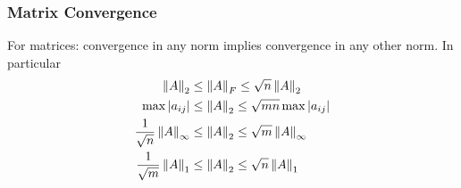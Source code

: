\documentclass{beamer}
\begin{document}
\begin{frame}\frametitle{Matrix Convergence}
	For matrices: convergence in any norm implies convergence in any other norm.  In particular
	\begin{align*}
		\left\|A \right\|_2 &\leq \left\|A \right\|_F \leq \sqrt{n}\left\|A \right\|_2\\
		\max|a_{ij}| &\leq \left\|A \right\|_2 \leq \sqrt{mn}\max|a_{ij}|\\
		\frac{1}{\sqrt{n}}\left\|A \right\|_{\infty} &\leq \left\|A \right\|_2 \leq \sqrt{m}\left\|A\right\|_{\infty}\\
		\frac{1}{\sqrt{m}}\left\|A \right\|_1 &\leq \left\|A \right\|_2 \leq \sqrt{n}\left\|A \right\|_1
	\end{align*}	
\end{frame}
\end{document}
